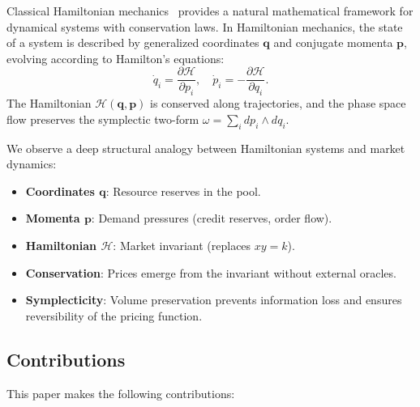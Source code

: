 \documentclass[11pt,twocolumn]{article}
\begin{document}
Classical Hamiltonian mechanics~\cite{arnold1989mathematical,goldstein2002classical} provides a natural mathematical framework for dynamical systems with conservation laws. In Hamiltonian mechanics, the state of a system is described by generalized coordinates $\bm{q}$ and conjugate momenta $\bm{p}$, evolving according to Hamilton's equations:
\begin{equation}
\dot{q}_i = \frac{\partial \mathcal{H}}{\partial p_i}, \quad \dot{p}_i = -\frac{\partial \mathcal{H}}{\partial q_i}.
\label{eq:hamilton}
\end{equation}
The Hamiltonian $\mathcal{H}(\bm{q}, \bm{p})$ is conserved along trajectories, and the phase space flow preserves the symplectic two-form $\omega = \sum_i dp_i \wedge dq_i$.

We observe a deep structural analogy between Hamiltonian systems and market dynamics:
\begin{itemize}[leftmargin=1.1em]
    \item \textbf{Coordinates $\bm{q}$}: Resource reserves in the pool.
    \item \textbf{Momenta $\bm{p}$}: Demand pressures (credit reserves, order flow).
    \item \textbf{Hamiltonian $\mathcal{H}$}: Market invariant (replaces $xy = k$).
    \item \textbf{Conservation}: Prices emerge from the invariant without external oracles.
    \item \textbf{Symplecticity}: Volume preservation prevents information loss and ensures reversibility of the pricing function.
\end{itemize}

\subsection{Contributions}

This paper makes the following contributions:
\end{document}

